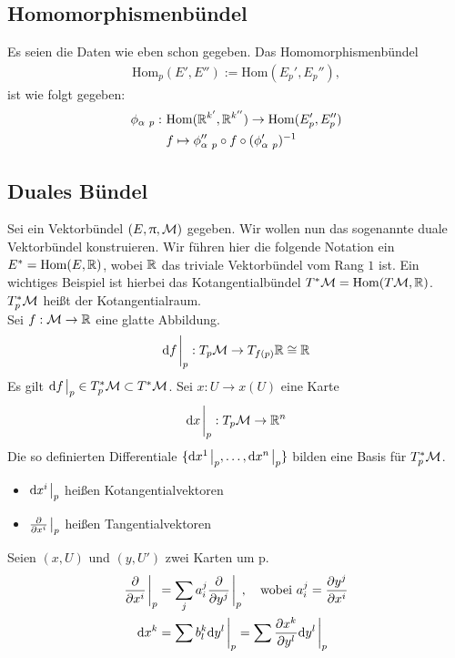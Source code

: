 \subsection{Homomorphismenbündel}
Es seien die Daten wie eben schon gegeben.
Das Homomorphismenbündel
\begin{align*}
\mathrm{Hom}_p (E', E'') := \mathrm{Hom}(E_{p}', E_{p}''),
\end{align*}
ist wie folgt gegeben:
\begin{align*}
\phi_{\alpha \ p} : \ & \mathrm{Hom}(\R^{k'}, \R^{k''}) \to \mathrm{Hom}(E_{p}', E_{p}'')\\
&f \mapsto \phi_{\alpha \ p}'' \circ f \circ (\phi_{\alpha \ p}')^{-1}
\end{align*}

\subsection{Duales Bündel}
Sei ein Vektorbündel $(E, \uppi, \mathcal{M})$ gegeben. 
Wir wollen nun das sogenannte duale Vektorbündel konstruieren.
Wir führen hier die folgende Notation ein $E^* = \mathrm{Hom}(E, \mathbb{R})$, wobei $\mathbb{R}$ das triviale Vektorbündel vom Rang $1$ ist.
Ein wichtiges Beispiel ist hierbei das Kotangentialbündel $T^{*}\mathcal{M} = \mathrm{Hom}(T\mathcal{M} , \mathbb{R})$.
$T^{*}_{p}\mathcal{M}$ heißt der Kotangentialraum.\\
Sei $f: \mathcal{M} \to \mathbb{R}$ eine glatte Abbildung.
\begin{align*}
\dd f \eval_p : T_p \mfk \to T_{f(p)}\R \cong \R
\end{align*}
Es gilt $\dd f\eval_p \in T_p^* \mfk \subset T^* \mfk$.
Sei $x: U \to x(U)$ eine Karte 
\begin{align*}
\dd x \eval_p : T_p \mfk \to \rn
\end{align*}
Die so definierten Differentiale $\{ \dd x^1 \eval_p, \dots , \dd x^n \eval_p \}$ bilden eine Basis für $T_p^* \mathcal{M}$.
\begin{itemize}
\item $\dd x^i \eval_p$ heißen Kotangentialvektoren
\item $\pdv{x^i} \eval_p$ heißen Tangentialvektoren
\end{itemize}
Seien $(x, U)$ und $(y, U')$ zwei Karten um p.
\begin{align}
\pdv{x^i}\eval_p &= \sum_j a^j_i \pdv{y^j} \eval_p, \quad \text{wobei} \ a^j_i = \pdv{y^j}{x^i} \\
\dd x^k &= \sum b^k_l \dd y^l \eval_p = \sum \pdv{x^k}{y^l} \dd y^l \eval_p
\end{align}

